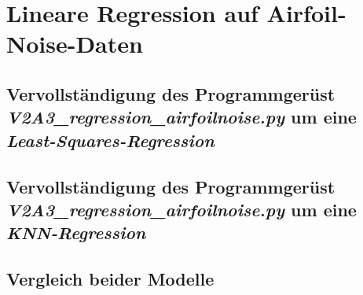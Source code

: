 \section{Lineare Regression auf Airfoil-Noise-Daten}

\subsection{
    Vervollständigung des Programmgerüst \textit{V2A3_regression_airfoilnoise.py} um eine \textit{Least-Squares-Regression}
}

\subsection{
    Vervollständigung des Programmgerüst \textit{V2A3_regression_airfoilnoise.py} um eine \textit{KNN-Regression}
}

\subsection{
    Vergleich beider Modelle
}
